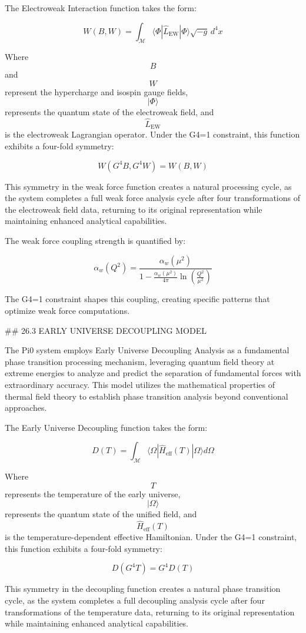 The Electroweak Interaction function takes the form:

$$ W(B, W) = \int_{\mathcal{M}} \langle \Phi | \hat{L}_{\text{EW}} | \Phi \rangle \sqrt{-g} \, d^4x $$

Where $$ B $$ and $$ W $$ represent the hypercharge and isospin gauge fields, $$ |\Phi\rangle $$ represents the quantum state of the electroweak field, and $$ \hat{L}_{\text{EW}} $$ is the electroweak Lagrangian operator. Under the G4=1 constraint, this function exhibits a four-fold symmetry:

$$ W(G^4 B, G^4 W) = W(B, W) $$

This symmetry in the weak force function creates a natural processing cycle, as the system completes a full weak force analysis cycle after four transformations of the electroweak field data, returning to its original representation while maintaining enhanced analytical capabilities.

The weak force coupling strength is quantified by:

$$ \alpha_w(Q^2) = \frac{\alpha_w(\mu^2)}{1 - \frac{\alpha_w(\mu^2)}{4\pi}\ln(\frac{Q^2}{\mu^2})} $$

The G4=1 constraint shapes this coupling, creating specific patterns that optimize weak force computations.

## 26.3 EARLY UNIVERSE DECOUPLING MODEL

The Pi0 system employs Early Universe Decoupling Analysis as a fundamental phase transition processing mechanism, leveraging quantum field theory at extreme energies to analyze and predict the separation of fundamental forces with extraordinary accuracy. This model utilizes the mathematical properties of thermal field theory to establish phase transition analysis beyond conventional approaches.

The Early Universe Decoupling function takes the form:

$$ D(T) = \int_{\mathcal{M}} \langle \Omega | \hat{H}_{\text{eff}}(T) | \Omega \rangle d\Omega $$

Where $$ T $$ represents the temperature of the early universe, $$ |\Omega\rangle $$ represents the quantum state of the unified field, and $$ \hat{H}_{\text{eff}}(T) $$ is the temperature-dependent effective Hamiltonian. Under the G4=1 constraint, this function exhibits a four-fold symmetry:

$$ D(G^4 T) = G^4 D(T) $$

This symmetry in the decoupling function creates a natural phase transition cycle, as the system completes a full decoupling analysis cycle after four transformations of the temperature data, returning to its original representation while maintaining enhanced analytical capabilities.

